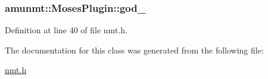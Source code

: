 \subsubsection[{\texorpdfstring{god\+\_\+}{god_}}]{ amunmt\+::\+Moses\+Plugin\+::god\+\_\+\hspace{0.3cm}{\ttfamily [private]}}\hypertarget{classamunmt_1_1MosesPlugin_a6a52ee09ba1d0cb547d02b301685e7f4}{}\label{classamunmt_1_1MosesPlugin_a6a52ee09ba1d0cb547d02b301685e7f4}


Definition at line 40 of file nmt.\+h.



The documentation for this class was generated from the following file\+:\begin{DoxyCompactItemize}
\item 
\hyperlink{nmt_8h}{nmt.\+h}\end{DoxyCompactItemize}
